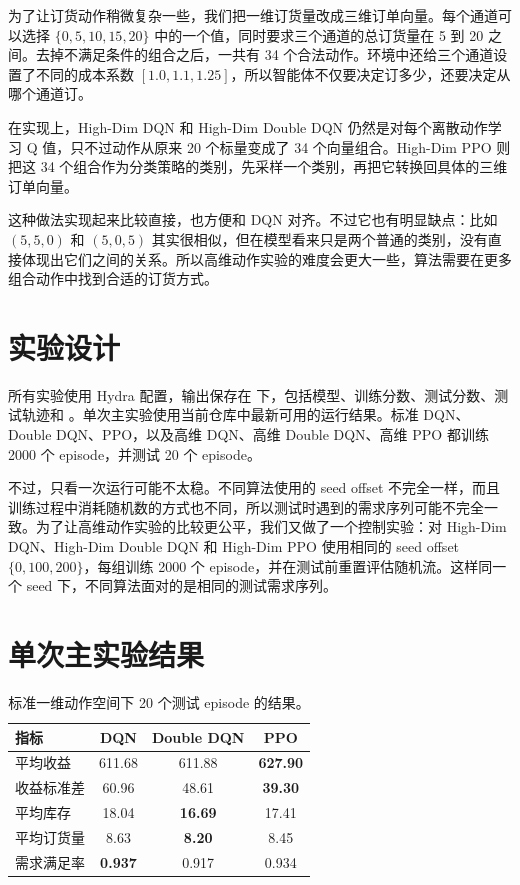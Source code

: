 \documentclass[nohyperref]{article}
\begin{document}
为了让订货动作稍微复杂一些，我们把一维订货量改成三维订单向量。每个通道可以选择 $\{0,5,10,15,20\}$ 中的一个值，同时要求三个通道的总订货量在 5 到 20 之间。去掉不满足条件的组合之后，一共有 34 个合法动作。环境中还给三个通道设置了不同的成本系数 $[1.0,1.1,1.25]$，所以智能体不仅要决定订多少，还要决定从哪个通道订。

在实现上，High-Dim DQN 和 High-Dim Double DQN 仍然是对每个离散动作学习 Q 值，只不过动作从原来 20 个标量变成了 34 个向量组合。High-Dim PPO 则把这 34 个组合作为分类策略的类别，先采样一个类别，再把它转换回具体的三维订单向量。

这种做法实现起来比较直接，也方便和 DQN 对齐。不过它也有明显缺点：比如 $(5,5,0)$ 和 $(5,0,5)$ 其实很相似，但在模型看来只是两个普通的类别，没有直接体现出它们之间的关系。所以高维动作实验的难度会更大一些，算法需要在更多组合动作中找到合适的订货方式。

\section{实验设计}

所有实验使用 Hydra 配置，输出保存在  下，包括模型、训练分数、测试分数、测试轨迹和 。单次主实验使用当前仓库中最新可用的运行结果。标准 DQN、Double DQN、PPO，以及高维 DQN、高维 Double DQN、高维 PPO 都训练 2000 个 episode，并测试 20 个 episode。

不过，只看一次运行可能不太稳。不同算法使用的 seed offset 不完全一样，而且训练过程中消耗随机数的方式也不同，所以测试时遇到的需求序列可能不完全一致。为了让高维动作实验的比较更公平，我们又做了一个控制实验：对 High-Dim DQN、High-Dim Double DQN 和 High-Dim PPO 使用相同的 seed offset $\{0,100,200\}$，每组训练 2000 个 episode，并在测试前重置评估随机流。这样同一个 seed 下，不同算法面对的是相同的测试需求序列。

\section{单次主实验结果}

\begin{table}[t]
\caption{标准一维动作空间下 20 个测试 episode 的结果。}
\label{tab:standard}
\vskip 0.15in
\begin{center}
\begin{small}
\begin{tabular}{lccc}
\toprule
指标 & DQN & Double DQN & PPO \\
\midrule
平均收益 & 611.68 & 611.88 & \textbf{627.90} \\
收益标准差 & 60.96 & 48.61 & \textbf{39.30} \\
平均库存 & 18.04 & \textbf{16.69} & 17.41 \\
平均订货量 & 8.63 & \textbf{8.20} & 8.45 \\
需求满足率 & \textbf{0.937} & 0.917 & 0.934 \\
\bottomrule
\end{tabular}
\end{small}
\end{center}
\vskip -0.1in
\end{table}
\end{document}
